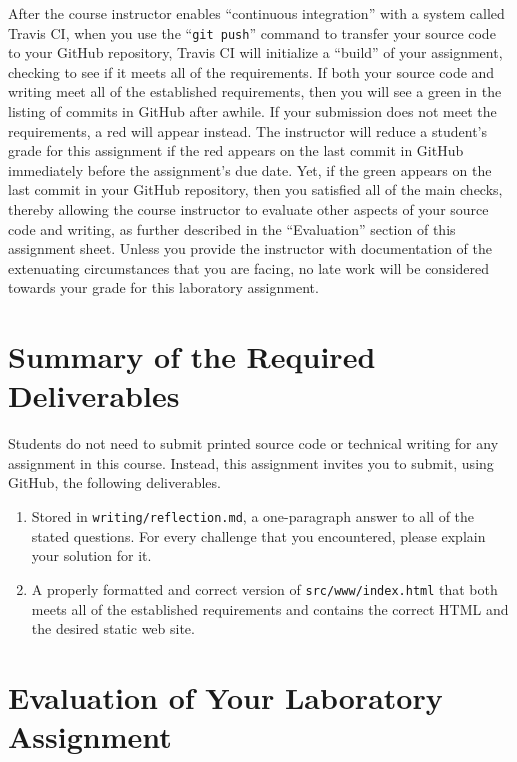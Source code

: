 \documentclass[11pt]{article}
\newcommand{\mainprogramsource}{\lstinline{src/www/index.html}}
\newcommand{\reflection}{\lstinline{writing/reflection.md}}
\newcommand{\gitpush}{\command{git push}}
\newcommand{\command}[1]{``\lstinline{#1}''}
\newcommand{\step}[1]{``{#1}''}
\newcommand{\checkmark}{\ding{51}}
\newcommand{\naughtmark}{\ding{55}}
\begin{document}
After the course instructor enables \step{continuous integration} with a system
called Travis CI, when you use the \gitpush{} command to transfer your source
code to your GitHub repository, Travis CI will initialize a \step{build} of your
assignment, checking to see if it meets all of the requirements. If both your
source code and writing meet all of the established requirements, then you will
see a green \checkmark{} in the listing of commits in GitHub after awhile. If
your submission does not meet the requirements, a red \naughtmark{} will appear
instead. The instructor will reduce a student's grade for this assignment if the
red \naughtmark{} appears on the last commit in GitHub immediately before the
assignment's due date. Yet, if the green \checkmark{} appears on the last commit
in your GitHub repository, then you satisfied all of the main checks, thereby
allowing the course instructor to evaluate other aspects of your source code and
writing, as further described in the \step{Evaluation} section of this
assignment sheet. Unless you provide the instructor with documentation of the
extenuating circumstances that you are facing, no late work will be considered
towards your grade for this laboratory assignment.

\section*{Summary of the Required Deliverables}

\noindent Students do not need to submit printed source code or technical writing for any assignment in this course.
Instead, this assignment invites you to submit, using GitHub, the following deliverables.

\begin{enumerate}

  \setlength{\itemsep}{0in}

\item Stored in \reflection{}, a one-paragraph answer to all of the stated
  questions. For every challenge that you encountered, please explain your
  solution for it.

\item A properly formatted and correct version of \mainprogramsource{} that both
  meets all of the established requirements and contains the correct HTML and
  the desired static web site.

\end{enumerate}

\section*{Evaluation of Your Laboratory Assignment}
\end{document}
